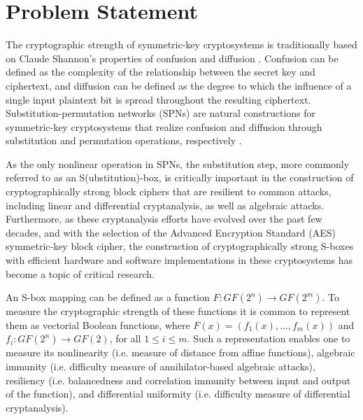 \section{Problem Statement}
The cryptographic strength of symmetric-key cryptosystems is traditionally based on 
Claude Shannon's properties of confusion and diffusion \cite{Shannon}. 
Confusion can be defined as the complexity of the relationship between the secret key and 
ciphertext, and diffusion can be defined as the degree to which the influence of 
a single input plaintext bit is spread throughout the resulting ciphertext.
Substitution-permutation networks (SPNs) are natural constructions for symmetric-key
cryptosystems that realize confusion and diffusion through substitution and
permutation operations, respectively \cite{Stinson}. 

As the only nonlinear operation in SPNs, the substitution step, 
more commonly referred to as an S(ubstitution)-box, is critically important
in the construction of cryptographically strong block ciphers that are resilient to
common attacks, including linear and differential cryptanalysis, as well as algebraic 
attacks. Furthermore, as these cryptanalysis efforts have evolved over the past 
few decades, and with the selection of the Advanced Encryption 
Standard (AES) symmetric-key block cipher, the construction 
of cryptographically strong S-boxes with efficient
hardware and software implementations in these 
cryptosystems has become a topic of critical research. 

An S-box mapping can be defined as a function $F : GF(2^n) \to GF(2^m)$. To measure
the cryptographic strength of these functions it is common to represent them as vectorial Boolean functions,
where $F(x) = (f_1(x), \dots, f_m(x))$ and $f_i : GF(2^n) \to GF(2)$, for all $1 \leq i \leq m$. Such a representation
enables one to measure its nonlinearity (i.e. measure of distance from affine functions), algebraic
immunity (i.e. difficulty measure of annihilator-based algebraic attacks), resiliency (i.e. balancedness 
and correlation immunity between input and output of the function), and differential uniformity (i.e.
difficulty measure of differential cryptanalysis). 

